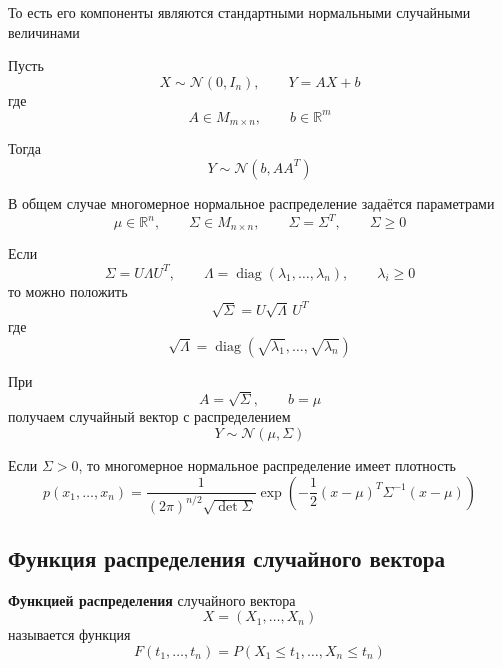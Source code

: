 \documentclass[12pt,a4paper]{article}
\begin{document}
\begin{example}
То есть его компоненты являются стандартными нормальными случайными величинами

Пусть
\[
X\sim\mathcal{N}(0,I_n),
\qquad
Y=AX+b
\]
где
\[
A\in M_{m\times n},
\qquad
b\in\mathbb{R}^m
\]

Тогда
\[
Y\sim\mathcal{N}(b,AA^T)
\]

В общем случае многомерное нормальное распределение задаётся параметрами
\[
\mu\in\mathbb{R}^n,
\qquad
\Sigma\in M_{n\times n},
\qquad
\Sigma=\Sigma^T,
\qquad
\Sigma\geq0
\]

Если
\[
\Sigma=U\Lambda U^T,
\qquad
\Lambda=\operatorname{diag}(\lambda_1,\ldots,\lambda_n),
\qquad
\lambda_i\geq0
\]
то можно положить
\[
\sqrt{\Sigma}
=
U\sqrt{\Lambda}\,U^T
\]
где
\[
\sqrt{\Lambda}
=
\operatorname{diag}(\sqrt{\lambda_1},\ldots,\sqrt{\lambda_n})
\]

При
\[
A=\sqrt{\Sigma},
\qquad
b=\mu
\]
получаем случайный вектор с распределением
\[
Y\sim\mathcal{N}(\mu,\Sigma)
\]

\end{example}

\begin{note}

Если $\Sigma>0$, то многомерное нормальное распределение имеет плотность
\[
p(x_1,\ldots,x_n)
=
\frac{1}{(2\pi)^{n/2}\sqrt{\det\Sigma}}
\exp\left(
-\frac12(x-\mu)^T\Sigma^{-1}(x-\mu)
\right)
\]

\end{note}

\subsection{Функция распределения случайного вектора}

\begin{definition}

\textbf{Функцией распределения} случайного вектора
\[
X=(X_1,\ldots,X_n)
\]
называется функция
\[
F(t_1,\ldots,t_n)
=
P(X_1\leq t_1,\ldots,X_n\leq t_n)
\]

\end{definition}
\end{document}
